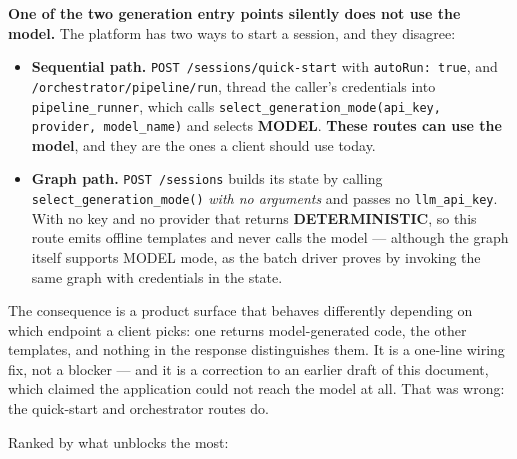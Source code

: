 \documentclass[11pt,a4paper]{article}
\begin{document}
\begin{notebox}[colframe=warn]
\textbf{One of the two generation entry points silently does not use the model.}
The platform has two ways to start a session, and they disagree:

\begin{itemize}[leftmargin=1.4em]
  \item \textbf{Sequential path.} \texttt{POST /sessions/quick-start} with
  \texttt{autoRun: true}, and \texttt{/orchestrator/pipeline/run}, thread the caller's
  credentials into \texttt{pipeline\_runner}, which calls
  \texttt{select\_generation\_mode(api\_key, provider, model\_name)} and selects
  \textbf{MODEL}. \textbf{These routes can use the model}, and they are the ones a
  client should use today.
  \item \textbf{Graph path.} \texttt{POST /sessions} builds its state by calling
  \texttt{select\_generation\_mode()} \emph{with no arguments} and passes no
  \texttt{llm\_api\_key}. With no key and no provider that returns
  \textbf{DETERMINISTIC}, so this route emits offline templates and never calls the
  model --- although the graph itself supports MODEL mode, as the batch driver proves
  by invoking the same graph with credentials in the state.
\end{itemize}

The consequence is a product surface that behaves differently depending on which
endpoint a client picks: one returns model-generated code, the other templates, and
nothing in the response distinguishes them. It is a one-line wiring fix, not a
blocker --- and it is a correction to an earlier draft of this document, which claimed
the application could not reach the model at all. That was wrong: the quick-start and
orchestrator routes do.
\end{notebox}

Ranked by what unblocks the most:
\end{document}
